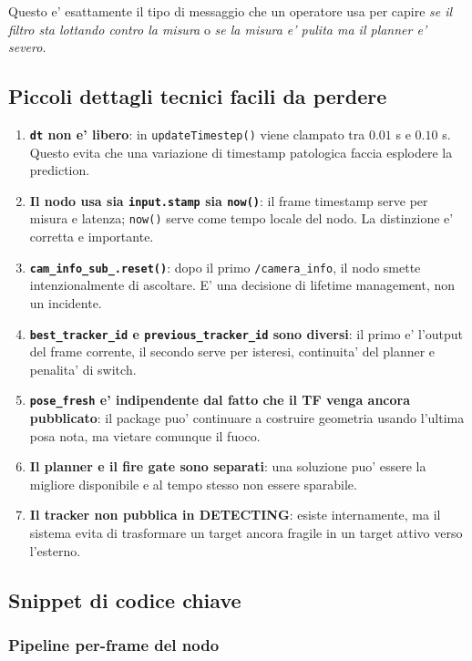 \documentclass[11pt,a4paper]{article}
\newcommand{\code}[1]{\texttt{#1}}
\newcommand{\topic}[1]{\texttt{#1}}
\begin{document}
Questo e' esattamente il tipo di messaggio che un operatore usa per capire \emph{se il filtro sta lottando contro la misura} o \emph{se la misura e' pulita ma il planner e' severo}.

\subsection{Piccoli dettagli tecnici facili da perdere}

\begin{enumerate}[leftmargin=1.4em]
  \item \textbf{\code{dt} non e' libero}: in \code{updateTimestep()} viene clampato tra \(0.01\) s e \(0.10\) s. Questo evita che una variazione di timestamp patologica faccia esplodere la prediction.
  \item \textbf{Il nodo usa sia \code{input.stamp} sia \code{now()}}: il frame timestamp serve per misura e latenza; \code{now()} serve come tempo locale del nodo. La distinzione e' corretta e importante.
  \item \textbf{\code{cam\_info\_sub\_.reset()}}: dopo il primo \topic{/camera_info}, il nodo smette intenzionalmente di ascoltare. E' una decisione di lifetime management, non un incidente.
  \item \textbf{\code{best\_tracker\_id} e \code{previous\_tracker\_id} sono diversi}: il primo e' l'output del frame corrente, il secondo serve per isteresi, continuita' del planner e penalita' di switch.
  \item \textbf{\code{pose\_fresh} e' indipendente dal fatto che il TF venga ancora pubblicato}: il package puo' continuare a costruire geometria usando l'ultima posa nota, ma vietare comunque il fuoco.
  \item \textbf{Il planner e il fire gate sono separati}: una soluzione puo' essere la migliore disponibile e al tempo stesso non essere sparabile.
  \item \textbf{Il tracker non pubblica in DETECTING}: esiste internamente, ma il sistema evita di trasformare un target ancora fragile in un target attivo verso l'esterno.
\end{enumerate}

\subsection{Snippet di codice chiave}

\subsubsection{Pipeline per-frame del nodo}
\end{document}

